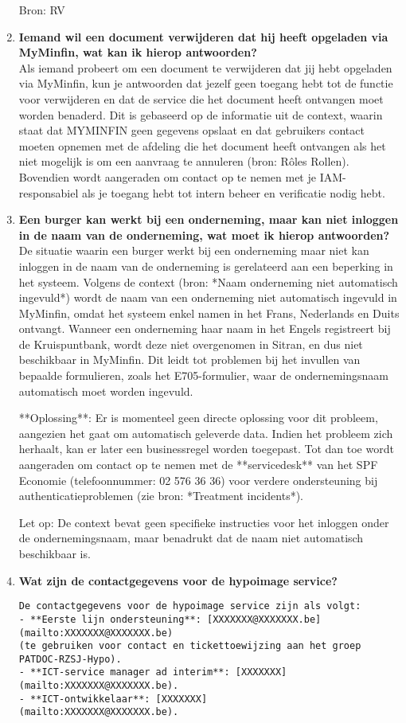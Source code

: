 \begin{enumerate}
        
    Bron: RV
    \item \textbf{Iemand wil een document verwijderen dat hij heeft opgeladen via MyMinfin, wat kan ik hierop antwoorden?} \\
    Als iemand probeert om een document te verwijderen dat jij hebt opgeladen via MyMinfin, kun je antwoorden dat jezelf geen toegang hebt tot de functie voor verwijderen en dat de service die het document heeft ontvangen moet worden benaderd. Dit is gebaseerd op de informatie uit de context, waarin staat dat MYMINFIN geen gegevens opslaat en dat gebruikers contact moeten opnemen met de afdeling die het document heeft ontvangen als het niet mogelijk is om een aanvraag te annuleren (bron: Rôles Rollen). Bovendien wordt aangeraden om contact op te nemen met je IAM-responsabiel als je toegang hebt tot intern beheer en verificatie nodig hebt.
    
    \item \textbf{Een burger kan werkt bij een onderneming, maar kan niet inloggen in de naam van de onderneming, wat moet ik hierop antwoorden?} \\
    De situatie waarin een burger werkt bij een onderneming maar niet kan inloggen in de naam van de onderneming is gerelateerd aan een beperking in het systeem. Volgens de context (bron: *Naam onderneming niet automatisch ingevuld*) wordt de naam van een onderneming niet automatisch ingevuld in MyMinfin, omdat het systeem enkel namen in het Frans, Nederlands en Duits ontvangt. Wanneer een onderneming haar naam in het Engels registreert bij de Kruispuntbank, wordt deze niet overgenomen in Sitran, en dus niet beschikbaar in MyMinfin. Dit leidt tot problemen bij het invullen van bepaalde formulieren, zoals het E705-formulier, waar de ondernemingsnaam automatisch moet worden ingevuld.
    
    **Oplossing**: Er is momenteel geen directe oplossing voor dit probleem, aangezien het gaat om automatisch geleverde data. Indien het probleem zich herhaalt, kan er later een businessregel worden toegepast. Tot dan toe wordt aangeraden om contact op te nemen met de **servicedesk** van het SPF Economie (telefoonnummer: 02 576 36 36) voor verdere ondersteuning bij authenticatieproblemen (zie bron: *Treatment incidents*). 
    
    Let op: De context bevat geen specifieke instructies voor het inloggen onder de ondernemingsnaam, maar benadrukt dat de naam niet automatisch beschikbaar is.
    
    
    \item \textbf{Wat zijn de contactgegevens voor de hypoimage service?} \\
    \begin{verbatim}
De contactgegevens voor de hypoimage service zijn als volgt:  
- **Eerste lijn ondersteuning**: [XXXXXXX@XXXXXXX.be]
(mailto:XXXXXXX@XXXXXXX.be) 
(te gebruiken voor contact en tickettoewijzing aan het groep PATDOC-RZSJ-Hypo).  
- **ICT-service manager ad interim**: [XXXXXXX]
(mailto:XXXXXXX@XXXXXXX.be).  
- **ICT-ontwikkelaar**: [XXXXXXX]
(mailto:XXXXXXX@XXXXXXX.be).  


\end{verbatim}
\end{enumerate}
